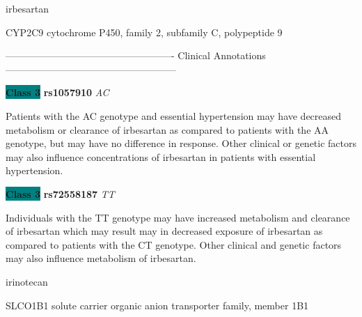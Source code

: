 \documentclass{resume} %
\begin{document}
\begin{rSection}{ irbesartan }
\begin{rSubsection}{ CYP2C9 }{ cytochrome P450, family 2, subfamily C, polypeptide 9 }{}{}
\item[] ---------------------------------------------------- Clinical Annotations -----------------------------------------------------\newline
\item \textbf{\colorbox{teal} {Class 3}} \textbf{ rs1057910 } \textit{ AC }
\item[] Patients with the AC genotype and essential hypertension may have decreased metabolism or clearance of irbesartan as compared to patients with the AA genotype, but may have no difference in response. Other clinical or genetic factors may also influence concentrations of irbesartan in patients with essential hypertension. \item \textbf{\colorbox{teal} {Class 3}} \textbf{ rs72558187 } \textit{ TT }
\item[] Individuals with the TT genotype may have increased metabolism and clearance of irbesartan which may result may in decreased exposure of irbesartan as compared to patients with the CT genotype. Other clinical and genetic factors may also influence metabolism of irbesartan.
\end{rSubsection}

\end{rSection}\begin{rSection}{ irinotecan }
\item[]

\begin{rSubsection}{ SLCO1B1 }{ solute carrier organic anion transporter family, member 1B1 }{}{}
\item[]


\end{rSubsection}
\end{rSection}
\end{document}
